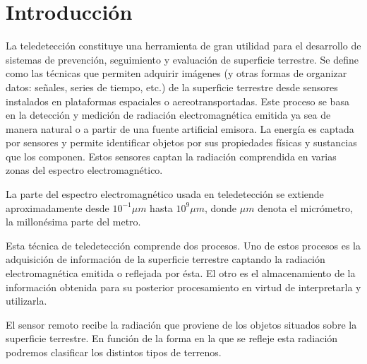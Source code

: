 
\chapter{Introducción}

La teledetección constituye una herramienta de gran utilidad para el desarrollo de sistemas de prevención, seguimiento y evaluación de superficie terrestre. Se define como  las técnicas que permiten adquirir imágenes (y otras formas de organizar datos: señales, series de tiempo, etc.) de la  superficie terrestre desde sensores instalados en plataformas espaciales o aereotransportadas. 
Este proceso se basa en la detección y medición de radiación electromagnética emitida ya sea de manera natural o a partir de una fuente artificial emisora.
La energía es captada por sensores y permite identificar objetos por sus propiedades físicas y sustancias que los componen. 
Estos sensores captan la radiación comprendida en varias zonas del espectro electromagnético. 

La parte del espectro electromagnético usada en teledetección se extiende aproximadamente desde $10^{-1} \mu m$ hasta $10^{9} \mu m$, donde $\mu m$ denota el micrómetro, la millonésima parte del metro.

Esta técnica de teledetección comprende dos procesos. 
Uno de estos procesos es la adquisición de información de la superficie terrestre captando la radiación electromagnética emitida o reflejada por ésta. 
El otro es el almacenamiento de la información obtenida para su posterior procesamiento en virtud de interpretarla y utilizarla. 

El sensor remoto recibe la radiación que proviene de los objetos situados sobre la superficie terrestre. 
En función de la forma en la que se refleje esta radiación podremos clasificar los distintos tipos de terrenos.


